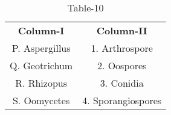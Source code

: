 \begin{table}[htbp]
  \centering
  \caption{Table-10}
  \label{tab:tables/table10.tex}
  \begin{tabular}{cc}
\textbf{Column-I} & \textbf{Column-II}\\

P. Aspergillus & 1. Arthrospore \\
Q. Geotrichum & 2. Oospores \\
R. Rhizopus & 3. Conidia \\
S. Oomycetes & 4. Sporangiospores \\
  
  
  
  \end{tabular}
\end{table}